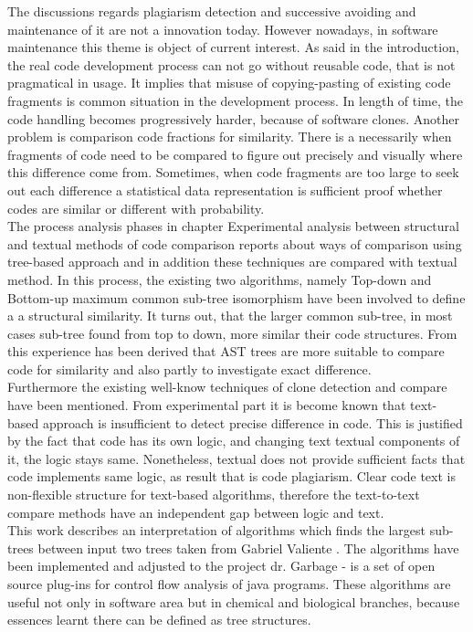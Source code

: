 \documentclass{report}
\begin{document}
The discussions regards plagiarism detection and successive avoiding and maintenance of it are not a innovation today. However nowadays, in software maintenance this theme is object of current interest. As said in the introduction, the real code development process can not go without reusable code, that is not pragmatical in usage. It implies that misuse of copying-pasting of existing code fragments is common situation in the development process. In length of time, the code handling becomes progressively harder, because of software clones. Another problem is comparison code fractions for similarity. There is a necessarily when fragments of code need to be compared to figure out precisely and visually where this difference come from. 
Sometimes, when code fragments are too large to seek out each difference a statistical data representation is sufficient proof whether codes are similar or different with probability.
\\
The process analysis phases in chapter Experimental analysis between structural and textual methods of code comparison reports about ways of comparison using tree-based approach and in addition these techniques are compared with textual method. In this process, the existing two algorithms, namely Top-down and Bottom-up maximum common sub-tree isomorphism have been involved to define a a structural similarity. It turns out, that the larger common sub-tree, in most cases sub-tree found from top to down, more similar their code structures. From this experience has been derived that AST trees are more suitable to compare code for similarity and also partly to investigate exact difference.
\\
Furthermore the existing well-know techniques of clone detection and compare have been mentioned. From experimental part it is become known that text-based approach is insufficient to detect precise difference in code. This is justified by the fact that code has its own logic, and changing text textual components of it, the logic stays same. Nonetheless, textual does not provide sufficient facts that code implements same logic, as result that is code plagiarism. 
Clear code text is non-flexible structure for text-based algorithms, therefore the text-to-text compare methods have an independent gap between logic and text.
\\
This work describes an interpretation of algorithms which finds the largest sub-trees between input two trees taken from Gabriel Valiente \cite{valiente}. The algorithms have been implemented and adjusted to the project dr. Garbage - is a set of open source plug-ins for control flow analysis of java programs. These algorithms are useful not only in software area but in chemical and biological branches, because essences learnt there can be defined as tree structures.
\end{document}
